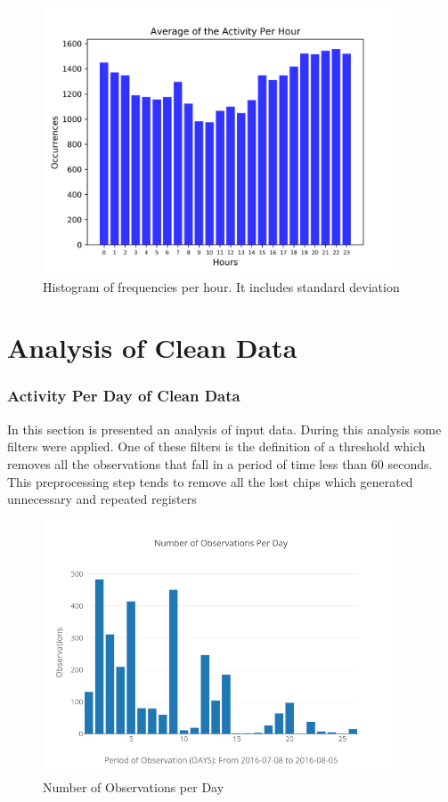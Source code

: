 \documentclass[11pt,fleqn]{book} %
\begin{document}
\begin{figure}[h!]%
\centering%
\includegraphics[width=400px]{Pictures/Morelia Hive 2histogramUnclean.png}%
\caption{Histogram of frequencies per hour. It includes standard deviation}%
\end{figure}

\chapter{Analysis of Clean Data}
\normalsize%
\subsection{Activity Per Day of Clean Data}%
\label{subsec:Activity Per Day of Clean Data}%
In this section is presented an analysis of input data. During this analysis some filters were applied. One of these filters is the definition of a threshold which removes all the observations that fall in a period of time less than 60 seconds. This preprocessing step tends to  remove all the lost chips which generated unnecessary and repeated registers %


\begin{figure}[h!]%
\centering%
\includegraphics[width=400px]{Pictures/Morelia Hive 2observationsPerdayClean.png}%
\caption{Number of Observations per Day}%
\end{figure}
\end{document}
